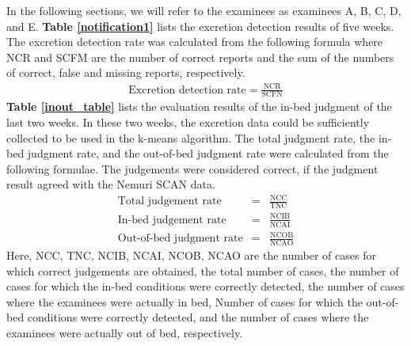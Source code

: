 \documentclass[publish,JRM,paper]{jaciiiarticle}
\begin{document}
In the following sections, we will refer to the examinees as examinees A, B, C, D, and E. {\bf Table \ref{notification1}} lists the excretion detection results of five weeks. The excretion detection rate was calculated from the following formula where NCR and SCFM are the number of correct reports and the sum of the numbers of correct, false and missing reports, respectively.
\begin{eqnarray}
  \mbox{Excretion detection rate}=\frac{\mbox{NCR}}{\mbox{SCFN}} \label{haisetsu}
\end{eqnarray}
{\bf Table \ref{inout_table}} lists the evaluation results of the in-bed judgment of the last two weeks. In these two weeks, the excretion data could be sufficiently collected to be used in the k-means algorithm. The total judgment rate, the in-bed judgment rate, and the out-of-bed judgment rate were calculated from the following formulae. The judgements were considered correct, if the judgment result agreed with the Nemuri SCAN data.
\begin{eqnarray}
  \mbox{Total judgement rate}&=&\frac{\mbox{NCC}}{\mbox{TNC}}\\
  \mbox{In-bed judgement rate}&=&\frac{\mbox{NCIB}}{\mbox{NCAI}}\\
  \mbox{Out-of-bed judgment rate}&=&\frac{\mbox{NCOB}}{\mbox{NCAO}}
\end{eqnarray}
Here, NCC, TNC, NCIB, NCAI, NCOB, NCAO are the number of cases for which correct judgements are obtained, the total number of cases, the number of cases for which the in-bed conditions were correctly detected, the number of cases where the examinees were actually in bed, Number of cases for which the out-of-bed conditions were correctly detected, and the number of cases where the examinees were actually out of bed, respectively.
\end{document}
